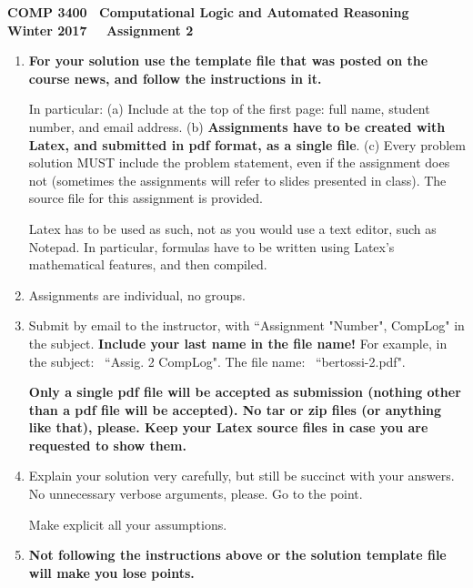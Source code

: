 \documentclass[fullapage,12pt]{article}
\begin{document}
\thispagestyle{empty}

\vspace*{-3.5cm}
\begin{center} \bf \large COMP 3400~ Computational Logic and Automated Reasoning\\ Winter 2017~~ Assignment 2
\end{center}

{\small {}
\begin{enumerate}
\item {\bf \Large For your solution use the template file that was posted on the course news, and follow the instructions in it.}

In particular: (a) Include at the top of the first page: full name, student number, and email address.
(b) {\bf Assignments have to be created with Latex, and submitted in pdf format, as a single file}. (c) Every problem solution MUST include
the problem statement, even if the assignment does not (sometimes the assignments will refer to slides presented in class). The source file for this assignment is provided.

Latex has to be used as such, not as you would use a text editor, such as Notepad. In particular,  formulas have to be written using Latex's mathematical
features, and then compiled.

\item Assignments are individual, no groups.
\item  %
Submit by email to the instructor, with ``Assignment "Number", CompLog" in the subject. {\bf Include your last name in the file name!} For example,
in the subject: \ ``Assig. 2 CompLog". The file name: \ ``bertossi-2.pdf".

{\bf Only a single pdf file will be accepted as submission (nothing other than a pdf file will be accepted). No tar or zip files (or anything like that), please. Keep your Latex source files in case you are requested to show them.}

\item Explain your solution very carefully, but still be succinct with your answers. No unnecessary verbose arguments, please. Go to the point.

Make explicit all your assumptions.

\item {\bf Not following the instructions above or the solution template file will make you lose points.}
\end{enumerate}}
\end{document}
